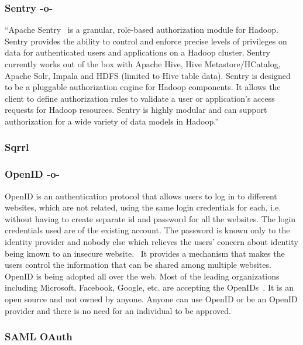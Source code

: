 \subsubsection{Sentry -o-}

``Apache Sentry~\cite{www-sentry} is a granular, role-based
authorization module for Hadoop. Sentry provides the ability to
control and enforce precise levels of privileges on data for
authenticated users and applications on a Hadoop cluster. Sentry
currently works out of the box with Apache Hive, Hive
Metastore/HCatalog, Apache Solr, Impala and HDFS (limited to Hive
table data). Sentry is designed to be a pluggable authorization engine
for Hadoop components. It allows the client to define authorization
rules to validate a user or application's access requests for Hadoop
resources. Sentry is highly modular and can support authorization for
a wide variety of data models in Hadoop.''

\subsubsection{Sqrrl}
\subsubsection{OpenID  -o-}

OpenID is an authentication protocol that allows users to log in to
different websites, which are not related, using the same login
credentials for each, i.e. without having to create separate id and
password for all the websites. The login credentials used are of the
existing account. The password is known only to the identity provider
and nobody else which relieves the users' concern about identity being
known to an insecure website.~\cite{ope1} It provides a mechanism that
makes the users control the information that can be shared among
multiple websites. OpenID is being adopted all over the web. Most of
the leading organizations including Microsoft, Facebook, Google,
etc. are accepting the OpenIDs~\cite{ope2}. It is an open source and
not owned by anyone. Anyone can use OpenID or be an OpenID provider
and there is no need for an individual to be approved.

\subsubsection{SAML OAuth}

